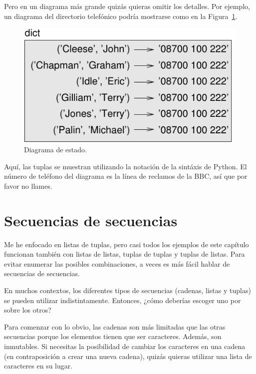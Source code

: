 \documentclass[10pt]{book}
\begin{document}
Pero en un diagrama más grande quizás quieras omitir los
detalles.  Por ejemplo, un diagrama del directorio telefónico podría
mostrarse como en la Figura~\ref{fig.dict2}.

\begin{figure}
\centerline
{\includegraphics[scale=0.8]{figs/dict2.pdf}}
\caption{Diagrama de estado.}
\label{fig.dict2}
\end{figure}

Aquí, las tuplas se muestran utilizando la notación de la sintáxis de Python.
El número de teléfono del diagrama es la línea de reclamos
de la BBC, así que por favor no llames.


\section{Secuencias de secuencias}

Me he enfocado en listas de tuplas, pero casi todos los ejemplos de
este capítulo funcionan también con listas de listas, tuplas de tuplas y
tuplas de listas.  Para evitar enumerar las posibles combinaciones, a veces
es más fácil hablar de secuencias de secuencias.

En muchos contextos, los diferentes tipos de secuencias (cadenas, listas y
tuplas) se pueden utilizar indistintamente.  Entonces, ¿cómo deberías escoger uno
por sobre los otros?

Para comenzar con lo obvio, las cadenas son más limitadas que las otras
secuencias porque los elementos tienen que ser caracteres.  Además,
son inmutables.  Si necesitas la posibilidad de cambiar los caracteres
en una cadena (en contraposición a crear una nueva cadena), quizás quieras
utilizar una lista de caracteres en su lugar.
\end{document}
